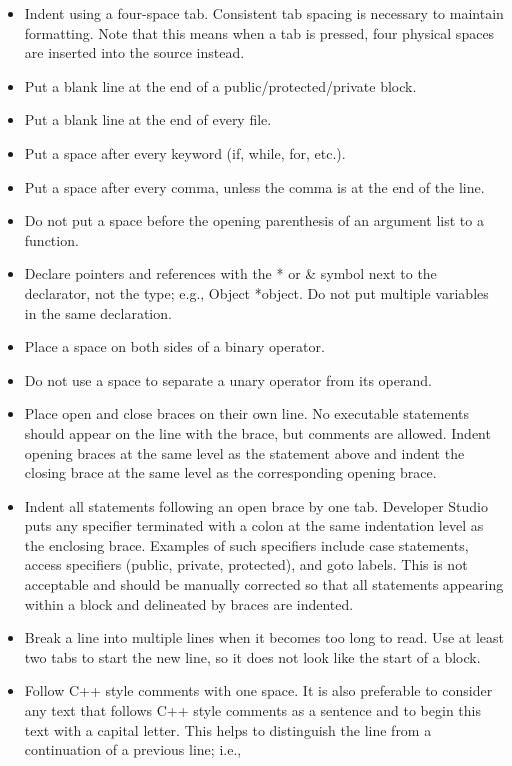 \begin{itemize}
\item Indent using a four-space tab. Consistent tab spacing is necessary to
maintain formatting. Note that this means when a tab is pressed, four physical spaces are
inserted into the source instead.
\item Put a blank line at the end of a public/protected/private block.
\item Put a blank line at the end of every file.
\item Put a space after every keyword (if, while, for, etc.).
\item Put a space after every comma, unless the comma is at the end of the line.
\item Do not put a space before the opening parenthesis of an argument list to a
function.
\item Declare pointers and references with the * or \& symbol next to the
declarator, not the type; e.g., Object *object. Do not put multiple variables in the same
declaration.
\item Place a space on both sides of a binary operator.
\item Do not use a space to separate a unary operator from its operand.
\item Place open and close braces on their own line. No executable statements
should appear on the line with the brace, but comments are allowed. Indent opening
braces at the same level as the statement above and indent the closing brace at
the same level as the corresponding opening brace.
\item Indent all statements following an open brace by one tab. Developer Studio
puts any specifier terminated with a colon at the same indentation level as the
enclosing brace. Examples of such specifiers include case statements, access
specifiers (public, private, protected), and goto labels. This is not acceptable
and should be manually corrected so that all statements appearing within a block
and delineated by braces are indented.
\item Break a line into multiple lines when it becomes too long to read. Use at
least two tabs to start the new line, so it does not look like the start of a
block.
\item Follow C++ style comments with one space. It is also preferable to
consider any text that follows C++ style comments as a sentence and to begin this text
with a capital letter. This helps to distinguish the line from a continuation of
a previous line; i.e.,  

\end{itemize}
